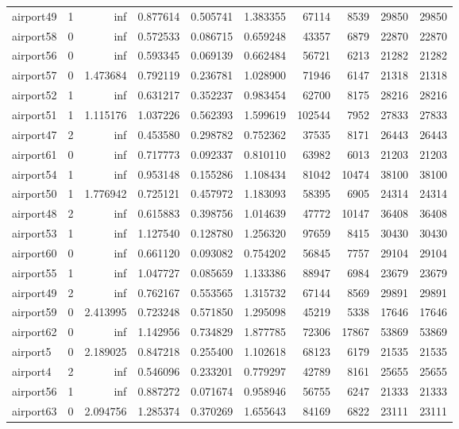 \begin{longtable}{|l|r|r|r|r|r|r|r|r|r|}
airport49 & 1 & inf & 0.877614 & 0.505741 & 1.383355 & 67114 & 8539 & 29850 & 29850 \\
airport58 & 0 & inf & 0.572533 & 0.086715 & 0.659248 & 43357 & 6879 & 22870 & 22870 \\
airport56 & 0 & inf & 0.593345 & 0.069139 & 0.662484 & 56721 & 6213 & 21282 & 21282 \\
airport57 & 0 & 1.473684 & 0.792119 & 0.236781 & 1.028900 & 71946 & 6147 & 21318 & 21318 \\
airport52 & 1 & inf & 0.631217 & 0.352237 & 0.983454 & 62700 & 8175 & 28216 & 28216 \\
airport51 & 1 & 1.115176 & 1.037226 & 0.562393 & 1.599619 & 102544 & 7952 & 27833 & 27833 \\
airport47 & 2 & inf & 0.453580 & 0.298782 & 0.752362 & 37535 & 8171 & 26443 & 26443 \\
airport61 & 0 & inf & 0.717773 & 0.092337 & 0.810110 & 63982 & 6013 & 21203 & 21203 \\
airport54 & 1 & inf & 0.953148 & 0.155286 & 1.108434 & 81042 & 10474 & 38100 & 38100 \\
airport50 & 1 & 1.776942 & 0.725121 & 0.457972 & 1.183093 & 58395 & 6905 & 24314 & 24314 \\
airport48 & 2 & inf & 0.615883 & 0.398756 & 1.014639 & 47772 & 10147 & 36408 & 36408 \\
airport53 & 1 & inf & 1.127540 & 0.128780 & 1.256320 & 97659 & 8415 & 30430 & 30430 \\
airport60 & 0 & inf & 0.661120 & 0.093082 & 0.754202 & 56845 & 7757 & 29104 & 29104 \\
airport55 & 1 & inf & 1.047727 & 0.085659 & 1.133386 & 88947 & 6984 & 23679 & 23679 \\
airport49 & 2 & inf & 0.762167 & 0.553565 & 1.315732 & 67144 & 8569 & 29891 & 29891 \\
airport59 & 0 & 2.413995 & 0.723248 & 0.571850 & 1.295098 & 45219 & 5338 & 17646 & 17646 \\
airport62 & 0 & inf & 1.142956 & 0.734829 & 1.877785 & 72306 & 17867 & 53869 & 53869 \\
airport5 & 0 & 2.189025 & 0.847218 & 0.255400 & 1.102618 & 68123 & 6179 & 21535 & 21535 \\
airport4 & 2 & inf & 0.546096 & 0.233201 & 0.779297 & 42789 & 8161 & 25655 & 25655 \\
airport56 & 1 & inf & 0.887272 & 0.071674 & 0.958946 & 56755 & 6247 & 21333 & 21333 \\
airport63 & 0 & 2.094756 & 1.285374 & 0.370269 & 1.655643 & 84169 & 6822 & 23111 & 23111 \\

\end{longtable}
